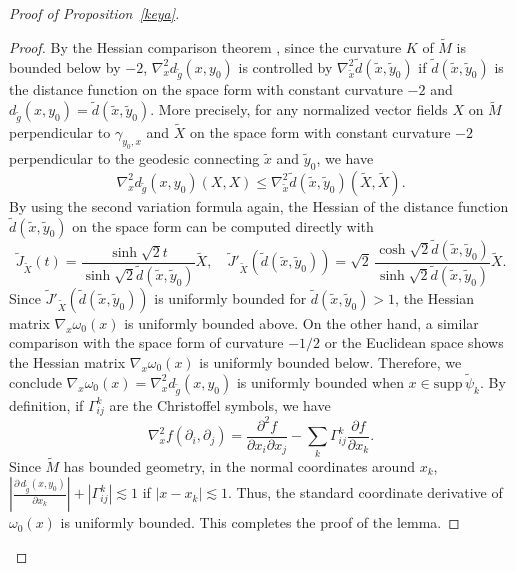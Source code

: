 \documentclass[10pt]{amsart}
\newcommand{\supp}{\mathrm{supp }}
\newcommand{\1}{{\bf 1}}
\begin{document}
\begin{proof}[Proof of Proposition~\ref{keya}]
\begin{proof}
{{By the Hessian comparison theorem \cite[Theorem A]{hesscompare}, since the curvature $K$ of $\tilde M$ is bounded below by $-2$, $\nabla_x^2 d_{\tilde g}(x,y_0)$ is controlled by $\nabla^2_{\tilde x}\tilde{d}(\tilde{x},\tilde{y}_0)$ if $\tilde{d}(\tilde{x},\tilde{y}_0)$ is the distance function on the space form with constant curvature $-2$ and $ d_{\tilde g}(x,y_0)=\tilde{d}(\tilde{x},\tilde{y}_0)$. {More precisely, for any normalized vector fields $X$ on $\tilde{M}$ perpendicular to $\gamma_{y_0,x}$ and $\tilde{X}$ on the space form with constant curvature $-2$ perpendicular to the geodesic connecting $\tilde{x}$ and $\tilde{y}_0$, we have
\[\nabla_x^2 d_{\tilde g}(x,y_0)(X,X)\leq \nabla^2_{\tilde x}\tilde{d}(\tilde{x},\tilde{y}_0)(\tilde{X},\tilde{X}).\]
} By using the second variation formula again, the Hessian of the distance function $\tilde{d}(\tilde{x},\tilde{y}_0)$ on the space form can be computed directly with
\begin{equation*}
    \tilde{J}_{\tilde{X}}(t)= \frac{\sinh\sqrt{2} t}{\sinh \sqrt{2} \tilde{d}(\tilde{x},\tilde{y}_0)}\tilde{X},\quad \tilde{J}'_{\tilde{X}}( \tilde{d}(\tilde{x},\tilde{y}_0))= \sqrt{2} \,\frac{\cosh\sqrt{2} \tilde{d}(\tilde{x},\tilde{y}_0)}{\sinh \sqrt{2} \tilde{d}(\tilde{x},\tilde{y}_0)}\tilde{X}.
\end{equation*}
Since $\tilde{J}'_{\tilde{X}}( \tilde{d}(\tilde{x},\tilde{y}_0))$ is uniformly bounded for $\tilde{d}(\tilde{x},\tilde{y}_0)>1$, {the Hessian matrix $\nabla_x \omega_0(x)$ is uniformly bounded above. On the other hand, a similar comparison with the space form of curvature $-1/2$ or the Euclidean space shows the Hessian matrix $\nabla_x \omega_0(x)$ is uniformly bounded below. Therefore, we conclude}
$\nabla_x \omega_0(x)=\nabla_x^2 d_{\tilde g}( x, y_0)$ is uniformly bounded when $x\in \supp\,\tilde \psi_k$. By definition, if $\Gamma_{ij}^k$ are the Christoffel symbols, we have  $$\nabla_x^2f(\partial_i, \partial_j)=\frac{\partial^2f}{\partial x_i\partial x_j }-\sum_k\Gamma_{ij}^k \frac{\partial f}{\partial x_k}.$$ Since $\tilde M$ has bounded geometry, in the normal coordinates around $x_k$, {$\left|\frac{\partial\,  d_{\tilde g}( x, y_0)}{\partial x_k}\right|+|\Gamma_{ij}^k|\lesssim 1$} if $|x-x_k|\lesssim 1$.  Thus, the standard coordinate derivative of $\omega_0(x)$ is uniformly bounded. This completes the proof of the lemma.}}
\end{proof}



\end{proof}
\end{document}
